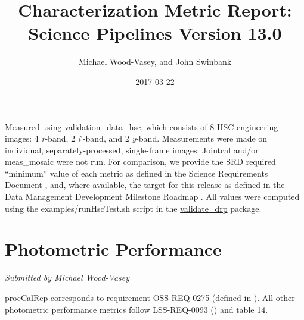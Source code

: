 \documentclass[DM,toc]{lsstdoc}
\title[V13.0 Characterization Report]{Characterization Metric Report: Science Pipelines Version 13.0}
\author{Michael Wood-Vasey, and John Swinbank}
\date{2017-03-22}
\begin{document}
\maketitle


Measured using
\href{https://github.com/lsst/validation_data_hsc}{validation\_data\_hsc},
which consists of 8 HSC engineering images: 4 \emph{r}-band, 2
\emph{i}'-band, and 2 \emph{y}-band. Measurements were made on
individual, separately-processed, single-frame images: Jointcal and/or
meas\_mosaic were not run. For comparison, we provide the SRD required
``minimum'' value of each metric as defined in the Science Requirements
Document , and, where available, the
target for this release as defined in the Data Management Development
Milestone Roadmap . All values
were computed using the examples/runHscTest.sh script in the
\href{https://github.com/lsst/validate_drp}{validate\_drp} package.

\section{Photometric Performance}\label{photometric-performance}

\emph{Submitted by Michael Wood-Vasey}

procCalRep corresponds to requirement OSS-REQ-0275 (defined in
). All other photometric performance
metrics follow LSS-REQ-0093 () and
 table 14.
\end{document}

